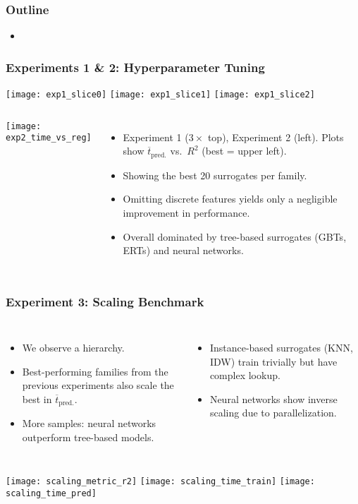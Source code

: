 \begin{frame}
	\frametitle{Outline}
	\begin{itemize}
		\item %
	\end{itemize}
\end{frame}

\begin{frame}
	\frametitle{Experiments 1 \& 2: Hyperparameter Tuning}

	\texttt{[image: exp1\_slice0]}\hfill%
	\texttt{[image: exp1\_slice1]}\hfill%
	\texttt{[image: exp1\_slice2]}

	\begin{columns}
		\texttt{[image: exp2\_time\_vs\_reg]}

		\begin{itemize}
			\item
				Experiment 1 ($3\times$ top), Experiment 2 (left).
				Plots show $\overline{t}_\text{pred.}$ vs.~$R^2$ (best = upper
				left).
			\item
				Showing the best 20 surrogates per family.
			\item
				Omitting discrete features yields only a negligible
				improvement in performance.
			\item
				Overall dominated by tree-based surrogates (GBTs, ERTs) and
				neural networks.
		\end{itemize}
	\end{columns}

\end{frame}

\begin{frame}
	\frametitle{Experiment 3: Scaling Benchmark}
	\begin{columns}
		\column{0.5\textwidth}
		\begin{itemize}
			\item
				We observe a hierarchy.
			\item
				Best-performing families from the previous experiments also scale the
				best in $\overline{t}_\text{pred.}$.
			\item
				More samples: neural networks outperform tree-based models.
		\end{itemize}

		\column{0.5\textwidth}
		\begin{itemize}
			\item
				Instance-based surrogates (KNN, IDW) train trivially but have
				complex lookup.
			\item
				Neural networks show inverse scaling due to
				parallelization.
		\end{itemize}
	\end{columns}

	\vspace{1em}

	\texttt{[image: scaling\_metric\_r2]}
	\texttt{[image: scaling\_time\_train]}
	\texttt{[image: scaling\_time\_pred]}

\end{frame}

